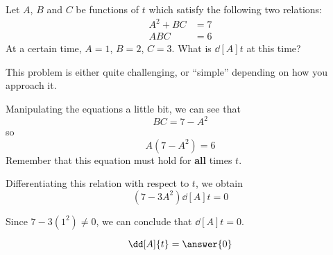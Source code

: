 \documentclass{ximera}
\author{Steven Gubkin}
\begin{document}
\begin{exercise}



Let $A$, $B$ and $C$ be functions of $t$ which satisfy the following
two relations:
\begin{align*}
	A^2+BC &= 7\\
	ABC &= 6 
\end{align*}
At a certain time, $A = 1$, $B=2$, $C=3$.  What is $\dd[A]{t}$ at this
time?

\begin{warning}
	This problem is either quite challenging, or ``simple''
        depending on how you approach it.
\end{warning}

\begin{hint}
  Manipulating the equations a little bit, we can see that
\[
BC = 7-A^2
\]
so
\[
A(7-A^2) = 6
\]
Remember that this equation must hold for \textbf{all} times $t$.
\end{hint}

\begin{hint}
  Differentiating this relation with respect to $t$, we obtain
  \[
  (7-3A^2)\dd[A]{t} = 0
\]
\end{hint}


\begin{hint}
  Since $7-3(1^2) \neq 0 $, we can conclude that $\dd[A]{t} = 0$.
\end{hint}

\begin{prompt}
  \[
  \dd[A]{t} = \answer{0}
  \]
\end{prompt}

\end{exercise}
\end{document}
